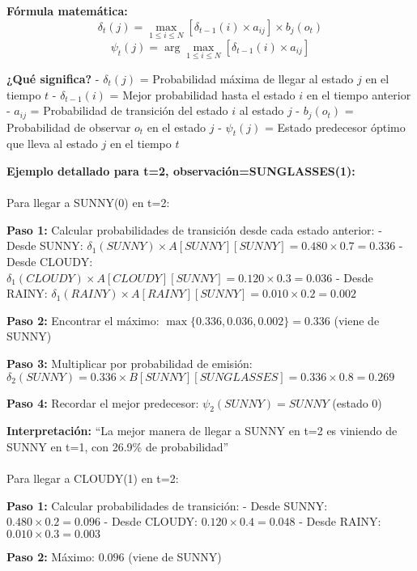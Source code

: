 \documentclass[
]{article}
\makeatletter
\let\oldparagraph\paragraph
\renewcommand{\paragraph}{
    \@ifstar
      \xxxParagraphStar
      \xxxParagraphNoStar
  }
\newcommand{\xxxParagraphStar}[1]{\oldparagraph*{#1}\mbox{}}
\newcommand{\xxxParagraphNoStar}[1]{\oldparagraph{#1}\mbox{}}
\makeatother
\begin{document}
\textbf{Fórmula matemática:}
\[\delta_t(j) = \max_{1 \leq i \leq N} [\delta_{t-1}(i) \times a_{ij}] \times b_j(o_t)\]
\[\psi_t(j) = \arg\max_{1 \leq i \leq N} [\delta_{t-1}(i) \times a_{ij}]\]

\textbf{¿Qué significa?} - \(\delta_t(j)\) = Probabilidad máxima de
llegar al estado \(j\) en el tiempo \(t\) - \(\delta_{t-1}(i)\) = Mejor
probabilidad hasta el estado \(i\) en el tiempo anterior - \(a_{ij}\) =
Probabilidad de transición del estado \(i\) al estado \(j\) -
\(b_j(o_t)\) = Probabilidad de observar \(o_t\) en el estado \(j\) -
\(\psi_t(j)\) = Estado predecesor óptimo que lleva al estado \(j\) en el
tiempo \(t\)

\textbf{Ejemplo detallado para t=2, observación=SUNGLASSES(1):}

\paragraph{Para llegar a SUNNY(0) en
t=2:}\label{para-llegar-a-sunny0-en-t2}

\textbf{Paso 1:} Calcular probabilidades de transición desde cada estado
anterior: - Desde SUNNY:
\(\delta_1(SUNNY) \times A[SUNNY][SUNNY] = 0.480 \times 0.7 = 0.336\) -
Desde CLOUDY:
\(\delta_1(CLOUDY) \times A[CLOUDY][SUNNY] = 0.120 \times 0.3 = 0.036\)
- Desde RAINY:
\(\delta_1(RAINY) \times A[RAINY][SUNNY] = 0.010 \times 0.2 = 0.002\)

\textbf{Paso 2:} Encontrar el máximo:
\(\max\{0.336, 0.036, 0.002\} = 0.336\) (viene de SUNNY)

\textbf{Paso 3:} Multiplicar por probabilidad de emisión:
\(\delta_2(SUNNY) = 0.336 \times B[SUNNY][SUNGLASSES] = 0.336 \times 0.8 = 0.269\)

\textbf{Paso 4:} Recordar el mejor predecesor: \(\psi_2(SUNNY) = SUNNY\)
(estado 0)

\textbf{Interpretación:} ``La mejor manera de llegar a SUNNY en t=2 es
viniendo de SUNNY en t=1, con 26.9\% de probabilidad''

\paragraph{Para llegar a CLOUDY(1) en
t=2:}\label{para-llegar-a-cloudy1-en-t2}

\textbf{Paso 1:} Calcular probabilidades de transición: - Desde SUNNY:
\(0.480 \times 0.2 = 0.096\) - Desde CLOUDY:
\(0.120 \times 0.4 = 0.048\) - Desde RAINY: \(0.010 \times 0.3 = 0.003\)

\textbf{Paso 2:} Máximo: \(0.096\) (viene de SUNNY)
\end{document}

